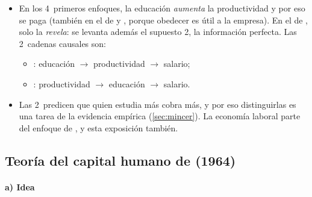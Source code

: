 \documentclass[11pt]{article}
\begin{document}
\begin{itemize}
\begin{enumerate}
  \item \emph{-}: la escuela enseña sobre todo a trabajar en organizaciones jerárquicas, a seguir instrucciones y a aceptar las normas sociales\nocite{BowlesGintis1976Schooling}.
  \item \emph{}:\footnote{ recibió el Premio Nobel de Economía en 2001, con  y , «por sus análisis de los mercados con información asimétrica»\nocite{Nobel2001AkerlofSpenceStiglitz}.} los títulos son una \emph{señal} de una habilidad que ya se tenía, no la causa de la productividad\nocite{Spence1973Job} .\footnote{\textcite{Spence1973Job} estudia la selección adversa en el mercado de trabajo; supone que la educación no aumenta la productividad para aislar el papel de la señal.}
  \end{enumerate}
\item En los 4~primeros enfoques, la educación \emph{aumenta} la productividad y por eso se paga (también en el de  y , porque obedecer es útil a la empresa). En el de , solo la \emph{revela}: se levanta además el supuesto 2, la información perfecta. Las 2~cadenas causales son:
  \begin{itemize}
  \item {}: educación $\to$ productividad $\to$ salario;
  \item {}: productividad $\to$ educación $\to$ salario.
  \end{itemize}
\item Las 2~predicen que quien estudia más cobra más, y por eso distinguirlas es una tarea de la evidencia empírica (\ref{sec:mincer}). La economía laboral parte del enfoque de , y esta exposición también.
\end{itemize}

\subsection{Teoría del capital humano de  (1964)}\label{sec:becker}

\paragraph{a) Idea}
\end{document}

